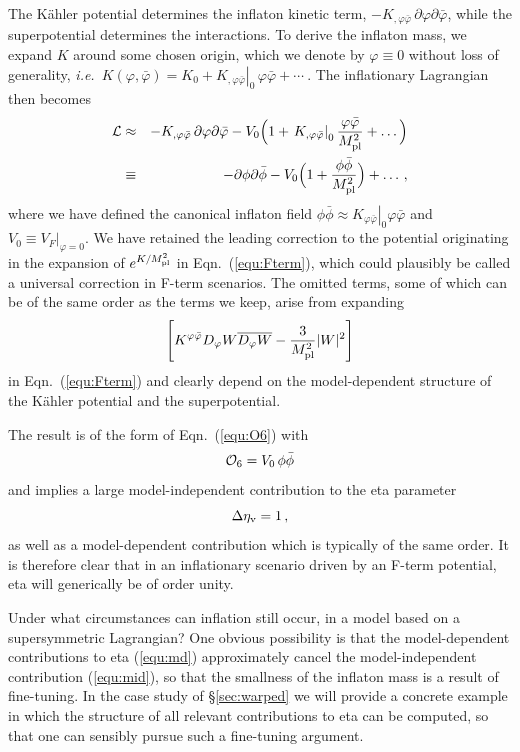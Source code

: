 \documentclass[12pt,letterpaper,rotate]{article}
\def\beq{\begin{equation}}
\def\eeq{\end{equation}}
\begin{document}
{The K\"ahler potential determines
the inflaton kinetic term, $-K_{,\varphi \bar \varphi} \, \partial \varphi \partial \bar \varphi$, while the superpotential determines the interactions.
To derive the inflaton mass,
we expand $K$ around some chosen origin, which we denote by $\varphi \equiv 0$ without loss of generality, {\it i.e.}~$K(\varphi, \bar \varphi) = K_0 + \left. K_{,\varphi \bar \varphi}\right|_0 \, \varphi \bar \varphi + \cdots\ $. The inflationary Lagrangian then becomes
\begin{eqnarray}
{\cal L} &\approx& - K_{,\varphi \bar \varphi}\, \partial \varphi  \partial \bar \varphi -  V_0 \Bigl(1+ \left. K_{,\varphi \bar \varphi}\right|_0 \frac{\varphi \bar \varphi}{M_{\rm pl}^2} + \dots \Bigr) \\
&\equiv& -  \partial \phi \partial \bar\phi - V_0 \Bigl(1+  \frac{\phi \bar \phi}{M_{\rm pl}^2} \Bigr) + \dots\, , \label{equ:mid}
\end{eqnarray}
where we have defined the canonical inflaton field $\phi\bar\phi \approx  \left. K_{\varphi \bar \varphi}\right|_0 \varphi \bar \varphi$ and $V_0 \equiv \left. V_F\right|_{\varphi =0}$.
We have retained the leading correction to the potential originating in the expansion of $e^{K/M_{\rm pl}^2}$ in Eqn.~(\ref{equ:Fterm}), which could plausibly be called a universal correction in F-term scenarios. The omitted terms, some of which
can be of the same order as the terms we keep, arise from expanding \beq\left[ K^{\varphi \bar \varphi} D_{\varphi} W \overline{D_{\varphi} W} - \frac{3}{M_{\rm pl}^2} |W|^2 \right]
\label{equ:md}
\eeq in Eqn.~(\ref{equ:Fterm}) and clearly depend on the model-dependent structure of the K\"ahler potential and the superpotential.

The result is of the form of Eqn.~(\ref{equ:O6}) with
\beq
{\cal O}_6 =   V_0\, \phi\bar\phi
\eeq
and implies a large model-independent contribution to the eta parameter
\beq
\label{equ:sugraETA}
\Delta \eta_{\rm v} = 1\, ,
\eeq
as well as a model-dependent contribution which is  typically of the same order.  It is therefore clear that in an inflationary scenario driven by an F-term potential, eta will generically be of order unity.

Under what circumstances can inflation still occur, in a model based on a supersymmetric Lagrangian?  One obvious possibility is that the model-dependent contributions to eta (\ref{equ:md}) approximately cancel the model-independent contribution (\ref{equ:mid}), so that the smallness of the inflaton mass is a result of fine-tuning.  In the case study of \S\ref{sec:warped} we will provide a concrete example in which the structure of all relevant contributions to eta can be computed, so that one can sensibly pursue such a fine-tuning argument.

}
\end{document}
